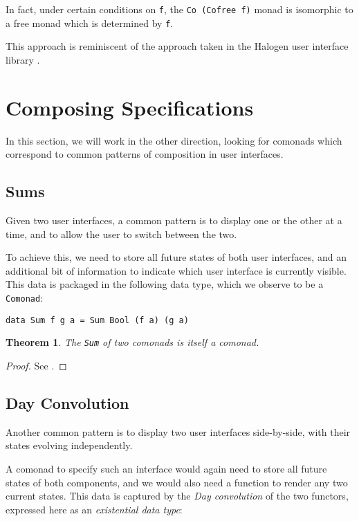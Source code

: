 \documentclass[nocopyrightspace]{sigplanconf}
\begin{document}
In fact, under certain conditions on \texttt{f}, the \texttt{Co (Cofree f)}
monad is isomorphic to a free monad which is determined by \texttt{f}.

This approach is reminiscent of the approach taken in the Halogen user interface
library \citep{halogen}.

\section{Composing Specifications}

In this section, we will work in the other direction, looking for comonads which
correspond to common patterns of composition in user interfaces.

\subsection{Sums}

Given two user interfaces, a common pattern is to display one or the other
at a time, and to allow the user to switch between the two.

To achieve this, we need to store all future states of both user interfaces, and an
additional bit of information to indicate which user interface is currently visible.
This data is packaged in the following data type, which we observe to be a \texttt{Comonad}:

\begin{verbatim}
data Sum f g a = Sum Bool (f a) (g a)
\end{verbatim}

\newtheorem{theorem}{Theorem}
\begin{theorem}
The \texttt{Sum} of two comonads is itself a comonad.
\end{theorem}

\begin{proof}
See \citet{freeman2}.
\end{proof}

\subsection{Day Convolution}

Another common pattern is to display two user interfaces side-by-side, with their
states evolving independently.

A comonad to specify such an interface would again need to store all future states of
both components, and we would also need a function to render any two current states.
This data is captured by the \textit{Day convolution} \citep{day} of the two functors,
expressed here as an \textit{existential data type}:
\end{document}
